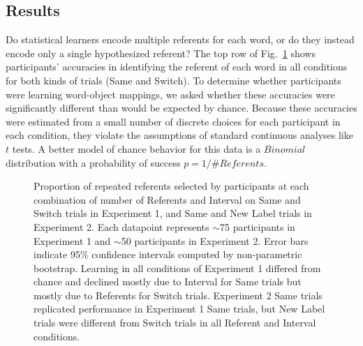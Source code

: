 \documentclass[man,floatsintext]{apa6}
\begin{document}
\subsection{Results}

Do statistical learners encode multiple referents for each word, or do they instead encode only a single hypothesized referent? The top row of Fig.~\ref{fig:exp1_2_data} shows participants' accuracies in identifying the referent of each word in all conditions for both kinds of trials (Same and Switch). To determine whether participants were learning word-object mappings, we asked whether these accuracies were significantly different than would be expected by chance. Because these accuracies were estimated from a small number of discrete choices for each participant in each condition, they violate the assumptions of standard continuous analyses like $t$ tests. A better model of chance behavior for this data is a $Binomial$ distribution with a probability of success $p=1/\# Referents$. 

 \begin{figure}[tb]
	\caption{\label{fig:exp1_2_data} Proportion of repeated referents selected by participants at each combination of number of Referents and Interval on Same and Switch trials in Experiment 1, and Same and New Label trials in Experiment 2. Each datapoint represents $\sim$75 participants in Experiment 1 and  $\sim$50 participants in Experiment 2. Error bars indicate 95\% confidence intervals computed by non-parametric bootstrap. Learning in all conditions of Experiment 1 differed from chance and declined mostly due to Interval for Same trials but mostly due to Referents for Switch trials. Experiment 2 Same trials replicated performance in Experiment 1 Same trials, but New Label trials were different from Switch trials in all Referent and Interval conditions.} 
\end{figure}
\end{document}
